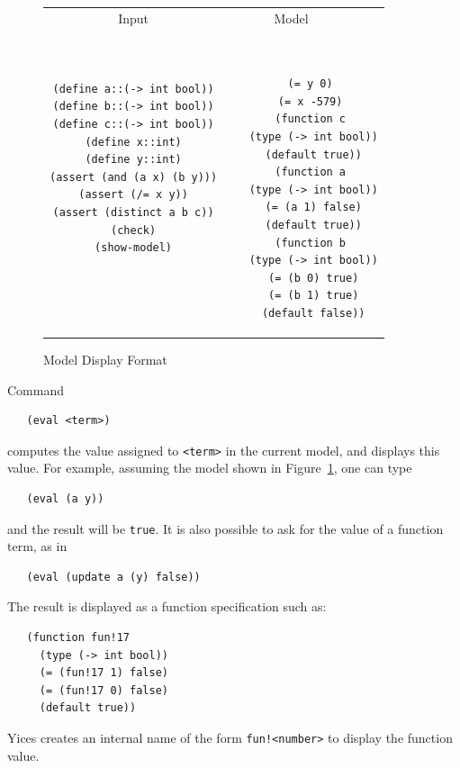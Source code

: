 \documentclass[11pt,twoside,fleqn,openright,titlepage]{cslreport}
\begin{document}
\begin{figure}
\begin{footnotesize}
\begin{center}
\begin{tabular}{c|c}
\multicolumn{1}{c}{Input} & \multicolumn{1}{c}{Model~~~~} \\[0.4em]

\begin{minipage}[t]{6cm}
\begin{verbatim}
(define a::(-> int bool))
(define b::(-> int bool))
(define c::(-> int bool))
(define x::int)
(define y::int)
(assert (and (a x) (b y)))
(assert (/= x y))
(assert (distinct a b c))
(check)
(show-model)
\end{verbatim}
\end{minipage}~~
&
~~~\begin{minipage}[t]{6cm}
\begin{verbatim}
  (= y 0)
  (= x -579)
  (function c
   (type (-> int bool))
   (default true))
  (function a
   (type (-> int bool))
   (= (a 1) false)
   (default true))
  (function b
   (type (-> int bool))
   (= (b 0) true)
   (= (b 1) true)
   (default false))
\end{verbatim}
\end{minipage}
\end{tabular}
\end{center}
\end{footnotesize}
\caption{Model Display Format}
\label{model-format}
\end{figure}

\pagebreak

\medskip\noindent
Command
\begin{small}
\begin{verbatim}
   (eval <term>)
\end{verbatim}
\end{small}
computes the value assigned to \texttt{<term>} in the current model,
and displays this value. For example, assuming the model shown in
Figure~\ref{model-format}, one can type
\begin{small}
\begin{verbatim}
   (eval (a y))
\end{verbatim}
\end{small}
and the result will be \texttt{true}. It is also possible to ask for
the value of a function term, as in
\begin{small}
\begin{verbatim}
   (eval (update a (y) false))
\end{verbatim}
\end{small}
The result is displayed as a function specification such as:
\begin{small}
\begin{verbatim}
   (function fun!17
     (type (-> int bool))
     (= (fun!17 1) false)
     (= (fun!17 0) false)
     (default true))
\end{verbatim}
\end{small}
Yices creates an internal name of the form \texttt{fun!<number>} to
display the function value.
\end{document}
